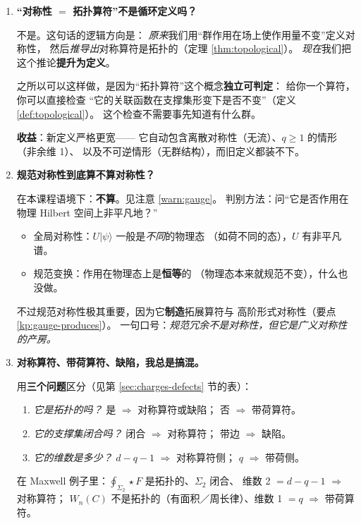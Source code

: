 \documentclass[UTF8,a4paper,11pt]{ctexart}
\theoremstyle{plain}
\theoremstyle{definition}
\theoremstyle{remark}
\newcommand{\hs}{\star}                %
\newcommand{\Ssurf}{\Sigma}
\newcommand{\Uop}{U}
\begin{document}
\begin{enumerate}[label=\textbf{Q\arabic*.},ref=\arabic*,leftmargin=1.3cm]

\item \textbf{“对称性 $=$ 拓扑算符”不是循环定义吗？}
\label{q:circular}

不是。这句话的逻辑方向是：
\emph{原来}我们用“群作用在场上使作用量不变”定义对称性，
然后\emph{推导出}对称算符是拓扑的（定理 \ref{thm:topological}）。
\emph{现在}我们把这个推论\textbf{提升为定义}。

之所以可以这样做，是因为“拓扑算符”这个概念\textbf{独立可判定}：
给你一个算符，你可以直接检查
“它的关联函数在支撑集形变下是否不变”（定义 \ref{def:topological}）。
这个检查不需要事先知道有什么群。

\textbf{收益}：新定义严格更宽——
它自动包含离散对称性（无流）、$q\ge1$ 的情形（非余维 1）、
以及不可逆情形（无群结构），而旧定义都装不下。

\item \textbf{规范对称性到底算不算对称性？}
\label{q:gauge}

在本课程语境下：\textbf{不算}。见注意 \ref{warn:gauge}。
判别方法：问“它是否作用在物理 Hilbert 空间上非平凡地？”
\begin{itemize}
  \item 全局对称性：$\Uop|\psi\rangle$ 一般是\emph{不同}的物理态
        （如荷不同的态），$\Uop$ 有非平凡谱。
  \item 规范变换：作用在物理态上是\textbf{恒等}的
        （物理态本来就规范不变），什么也没做。
\end{itemize}
不过规范对称性极其重要，因为它\textbf{制造}拓展算符与
高阶形式对称性（要点 \ref{kp:gauge-produces}）。
一句口号：\emph{规范冗余不是对称性，但它是广义对称性的产房。}

\item \textbf{对称算符、带荷算符、缺陷，我总是搞混。}
\label{q:three}

用\textbf{三个问题}区分（见第 \ref{sec:charges-defects} 节的表）：
\begin{enumerate}[label=(\roman*)]
  \item \emph{它是拓扑的吗？} 是 $\Rightarrow$ 对称算符或缺陷；
        否 $\Rightarrow$ 带荷算符。
  \item \emph{它的支撑集闭合吗？} 闭合 $\Rightarrow$ 对称算符；
        带边 $\Rightarrow$ 缺陷。
  \item \emph{它的维数是多少？} $d-q-1$ $\Rightarrow$ 对称算符侧；
        $q$ $\Rightarrow$ 带荷侧。
\end{enumerate}
在 Maxwell 例子里：$\oint_{\Ssurf_2}\hs F$ 是拓扑的、$\Ssurf_2$ 闭合、
维数 2 $=d-q-1$ $\Rightarrow$ 对称算符；
$W_n(C)$ 不是拓扑的（有面积／周长律）、维数 1 $=q$ $\Rightarrow$ 带荷算符。


\end{enumerate}
\end{document}
